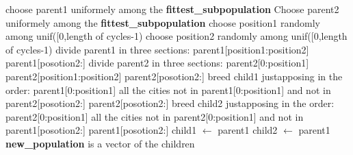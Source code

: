 \begin{algorithm}[H]
    \begin{algorithmic}[1]
  			\State choose parent1 uniformely among the \textbf{fittest\_subpopulation}
  			\State Choose parent2 uniformely among the \textbf{fittest\_subpopulation}
  				\State choose position1 randomly among unif([0,length of cycles-1)
  				\State choose position2 randomly among unif([0,length of cycles-1)
  				\State divide parent1 in three sections: 
  				\State parent1[position1:position2]
  				\State parent1[posotion2:]
  				\State divide parent2 in three sections:
  				\State parent2[0:position1] 
  				\State parent2[position1:position2]
  				\State parent2[posotion2:]
  				\State breed child1 justapposing in the order:
  				\State parent1[0:position1]
  				\State all the cities not in  parent1[0:position1] and not in parent2[posotion2:]
  				\State parent2[posotion2:]
  				\State breed child2 justapposing in the order:
  				\State parent2[0:position1]
  				\State all the cities not in  parent2[0:position1] and not in parent1[posotion2:]
  				\State parent1[posotion2:]
  			\Else
  				\State child1 $\leftarrow$ parent1
  				\State child2 $\leftarrow$ parent1
  			\EndIf
      	\EndFor
        \State \textbf{new\_population} is a vector of the children 
       \EndFunction
\end{algorithmic}
\end{algorithm}
